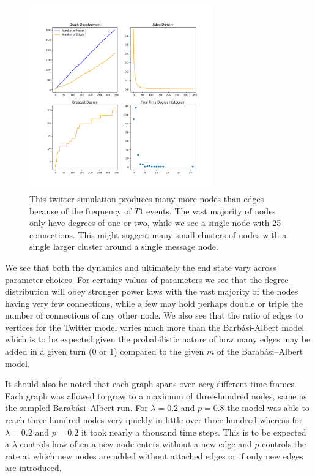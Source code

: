 \begin{figure}[h!]
    \includegraphics[width=8cm]{Images/twitter_sim_stats_3_0.8_0.8.png}
    \centering
    \caption{This twitter simulation produces many more nodes than 
    edges because of the frequency of $T1$ events. The vast majority of nodes only 
    have degrees of one or two, while we see a single node with 25 connections.
    This might suggest many small clusters of nodes with a single larger
    cluster around a single message node.}
\end{figure}

\FloatBarrier

We see that both the dynamics and ultimately the end state vary across parameter choices.
For certainy values of parameters we see that the degree distribution will obey stronger
power laws with the vast majority of the nodes having very few connections, while a few may hold
perhaps double or triple the number of connections of any other node. We also see that
the ratio of edges to vertices for the Twitter model varies much more than the Barbási-Albert model
which is to be expected given the probabilistic nature of how many edges may be added in a given turn (0 or 1) compared
to the given $m$ of the Barabási–Albert model.

\vspace{3mm}

It should also be noted that each graph spans over \textit{very} different
time frames. Each graph was allowed to grow to a maximum of three-hundred nodes, same as the
sampled Barabási–Albert run. For $\lambda=0.2$ and $p=0.8$ the model was able to reach 
three-hundred nodes very quickly in little over three-hundred whereas for $\lambda=0.2$ and $p=0.2$ it took nearly a thousand time
steps. This is to be expected a $\lambda$ controls how often a new node enters without a new edge and
$p$ controls the rate at which new nodes are added without attached edges or if only new edges are introduced. 

